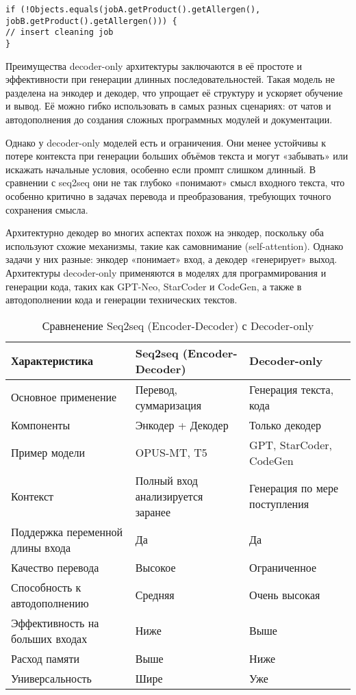 \begin{lstlisting}[caption={Ответ, который модель может сгенерировать}, label={lst:model-answer}]
if (!Objects.equals(jobA.getProduct().getAllergen(), jobB.getProduct().getAllergen())) {
// insert cleaning job
}
\end{lstlisting}

Преимущества decoder-only архитектуры заключаются в её простоте и эффективности при генерации длинных последовательностей. Такая модель не разделена на энкодер и декодер, что упрощает её структуру и ускоряет обучение и вывод. Её можно гибко использовать в самых разных сценариях: от чатов и автодополнения до создания сложных программных модулей и документации.

Однако у decoder-only моделей есть и ограничения. Они менее устойчивы к потере контекста при генерации больших объёмов текста и могут «забывать» или искажать начальные условия, особенно если промпт слишком длинный. В сравнении с seq2seq они не так глубоко «понимают» смысл входного текста, что особенно критично в задачах перевода и преобразования, требующих точного сохранения смысла.

Архитектурно декодер во многих аспектах похож на энкодер, поскольку оба используют схожие механизмы, такие как самовнимание (self-attention). Однако задачи у них разные: энкодер «понимает» вход, а декодер «генерирует» выход. Архитектуры decoder-only применяются в моделях для программирования и генерации кода, таких как GPT-Neo, StarCoder и CodeGen, а также в автодополнении кода и генерации технических текстов.

\begin{table}[H]
\centering
\caption{Сравненение Seq2seq (Encoder-Decoder) с Decoder-only}
\begin{tabularx}{\textwidth}{|p{4cm}|p{4cm}|X|}
\hline
\textbf{Характеристика}         & \textbf{Seq2seq (Encoder-Decoder)} & \textbf{Decoder-only} \\
\hline
Основное применение             & Перевод, суммаризация & Генерация текста, кода \\
\hline
Компоненты                       & Энкодер + Декодер  & Только декодер \\
\hline
Пример модели                    & OPUS-MT, T5 & GPT, StarCoder, CodeGen \\
\hline
Контекст                         & Полный вход анализируется заранее & Генерация по мере поступления \\
\hline
Поддержка переменной длины входа & Да & Да \\
\hline
 Качество перевода               & Высокое & Ограниченное \\
\hline
 Способность к автодополнению    & Средняя & Очень высокая \\
\hline
 Эффективность на больших входах & Ниже & Выше \\
\hline
 Расход памяти                   & Выше & Ниже \\
\hline
 Универсальность                 & Шире & Уже \\
\hline
\end{tabularx}
\label{table:compareModels}
\end{table}

